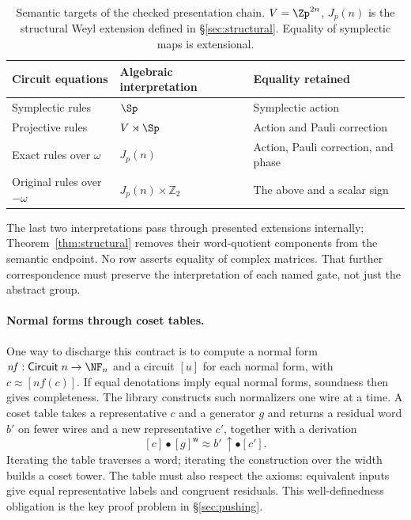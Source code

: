 \begin{table}[t]
\caption{Semantic targets of the checked presentation chain.
$V=\Zp^{2n}$, $J_p(n)$ is the structural Weyl extension defined in
\S\ref{sec:structural}. Equality of symplectic maps is extensional.}
\label{tab:targets}
\centering\small
\begin{tabular}{@{}p{}p{}p{}@{}}
\toprule
Circuit equations & Algebraic interpretation & Equality retained \\
\midrule
Symplectic rules & $\Sp$ & Symplectic action \\
Projective rules & $V\rtimes\Sp$ & Action and Pauli correction \\
Exact rules over $\omega$ & $J_p(n)$ &
Action, Pauli correction, and phase \\
Original rules over $-\omega$ & $J_p(n)\times\mathbb Z_2$ &
The above and a scalar sign \\
\bottomrule
\end{tabular}
\end{table}

The last two interpretations pass through presented extensions
internally; Theorem~\ref{thm:structural} removes their word-quotient
components from the semantic endpoint. No row asserts equality of
complex matrices. That further correspondence must preserve the
interpretation of each named gate, not just the abstract group.

\paragraph{Normal forms through coset tables.}
One way to discharge this contract is to compute a normal form
$\mathit{nf}:\mathsf{Circuit}\;n\to\NF_n$ and a circuit
$[u]$ for each normal form, with $c\approx[\mathit{nf}(c)]$.
If equal denotations imply equal normal forms, soundness then gives
completeness.  The library constructs such normalizers one wire at a
time.  A coset table takes a representative $c$ and a generator $g$ and
returns a residual word $b'$ on fewer wires and a new representative
$c'$, together with a derivation
\[
  [c]\bullet[g]^{\mathsf w}\approx b'\,{\uparrow}\bullet[c'].
\]
Iterating the table traverses a word; iterating the construction over
the width builds a coset tower.  The table must also respect the axioms:
equivalent inputs give equal representative labels and congruent
residuals.  This well-definedness obligation is the key proof problem
in \S\ref{sec:pushing}.

